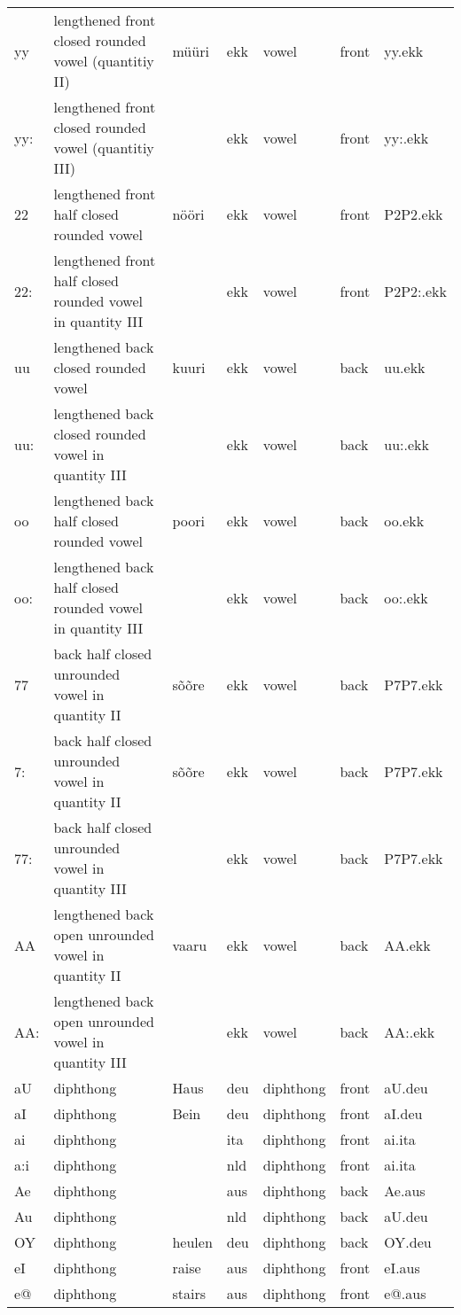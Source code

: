 \begin{longtable}{l|l|l|l|l|l|l}
yy	& lengthened front closed rounded vowel (quantitiy II)	& müüri	& ekk	& vowel	& front	& yy.ekk\\
yy:	& lengthened front closed rounded vowel (quantitiy III)	& 	& ekk	& vowel	& front	& yy:.ekk\\
22	& lengthened front half closed rounded vowel	& nööri	& ekk	& vowel	& front	& P2P2.ekk\\
22:	& lengthened front half closed rounded vowel in quantity III	& 	& ekk	& vowel	& front	& P2P2:.ekk\\
uu	& lengthened back closed rounded vowel	& kuuri	& ekk	& vowel	& back	& uu.ekk\\
uu:	& lengthened back closed rounded vowel in quantity III	& 	& ekk	& vowel	& back	& uu:.ekk\\
oo	& lengthened back half closed rounded vowel	& poori	& ekk	& vowel	& back	& oo.ekk\\
oo:	& lengthened back half closed rounded vowel in quantity III	& 	& ekk	& vowel	& back	& oo:.ekk\\
77	& back half closed unrounded vowel in quantity II	& sõõre	& ekk	& vowel	& back	& P7P7.ekk\\
7:	& back half closed unrounded vowel in quantity II	& sõõre	& ekk	& vowel	& back	& P7P7.ekk\\
77:	& back half closed unrounded vowel in quantity III	& 	& ekk	& vowel	& back	& P7P7.ekk\\
AA	& lengthened back open unrounded vowel in quantity II	& vaaru	& ekk	& vowel	& back	& AA.ekk\\
AA:	& lengthened back open unrounded vowel in quantity III	& 	& ekk	& vowel	& back	& AA:.ekk\\
aU	& diphthong	& Haus	& deu	& diphthong	& front\textgreaterback	& aU.deu\\
aI	& diphthong	& Bein	& deu	& diphthong	& front	& aI.deu\\
ai	& diphthong	& 	& ita	& diphthong	& front	& ai.ita\\
a:i	& diphthong	& 	& nld	& diphthong	& front	& ai.ita\\
Ae	& diphthong	& 	& aus	& diphthong	& back\textgreaterfront	& Ae.aus\\
Au	& diphthong	& 	& nld	& diphthong	& back	& aU.deu\\
OY	& diphthong	& heulen	& deu	& diphthong	& back\textgreaterfront	& OY.deu\\
eI	& diphthong	& raise	& aus	& diphthong	& front	& eI.aus\\
e@	& diphthong	& stairs	& aus	& diphthong	& front\textgreatercentral	& e@.aus\\

\end{longtable}
